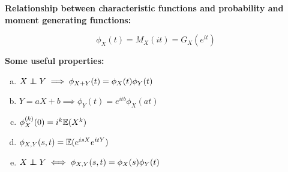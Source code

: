 \begin{remark} \textbf{Relationship between characteristic functions and probability and moment generating functions:}

\[
\phi_X(t)  =M_X(it) = G_X(e^{it})
\]

\end{remark}

\begin{theorem}

\textbf{Some useful properties:}

\begin{enumerate}[(a)]

\item \(X \indep Y \implies \phi_{X + Y}(t) = \phi_X(t) \phi_Y(t)\)

\item \(Y = aX + b \implies \phi_Y(t) = e^{itb} \phi_X(at)\)

\item \(\phi_X^{(k)}(0) = i^k \E(X^k)\)

\item \(\phi_{X,Y}(s,t) = \E(e^{isX}e^{itY})\)

\item \(X \indep Y \iff \phi_{X,Y}(s,t) = \phi_X(s) \phi_Y(t)\)

\end{enumerate}

\end{theorem}

